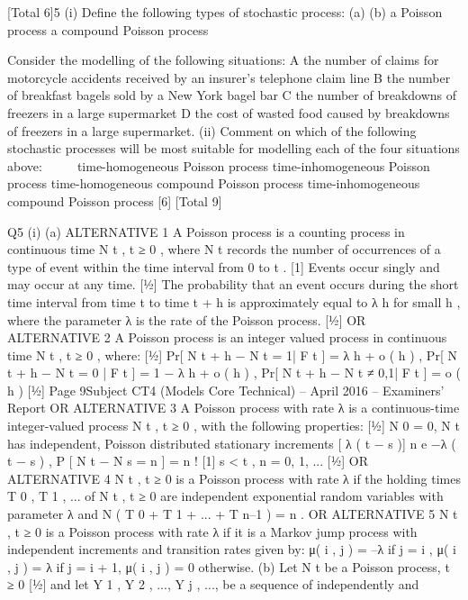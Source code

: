 \documentclass[a4paper,12pt]{article}
\begin{document}
[Total 6]5
(i)
Define the following types of stochastic process:
(a)
(b)
a Poisson process
a compound Poisson process

Consider the modelling of the following situations:
A the number of claims for motorcycle accidents received by an insurer’s
telephone claim line
B the number of breakfast bagels sold by a New York bagel bar
C the number of breakdowns of freezers in a large supermarket
D the cost of wasted food caused by breakdowns of freezers in a large
supermarket.
(ii) Comment on which of the following stochastic processes will be most suitable
for modelling each of the four situations above:




time-homogeneous Poisson process
time-inhomogeneous Poisson process
time-homogeneous compound Poisson process
time-inhomogeneous compound Poisson process
[6]
[Total 9]

Q5
(i)
(a)
ALTERNATIVE 1
A Poisson process is a counting process in continuous time { N t , t ≥ 0} ,
where N t records the number of occurrences of a type of event within
the time interval from 0 to t .
[1]
Events occur singly and may occur at any time.
[1⁄2]
The probability that an event occurs during the short time interval from
time t to time t + h is approximately equal to λ h for small h , where the
parameter λ is the rate of the Poisson process.
[1⁄2]
OR ALTERNATIVE 2
A Poisson process is an integer valued process in continuous time
{ N t , t ≥ 0} , where:
[1⁄2]
Pr[ N t + h − N t = 1| F t ] = λ h + o ( h ) ,
Pr[ N t + h − N t = 0 | F t ] = 1 − λ h + o ( h ) ,
Pr[ N t + h − N t ≠ 0,1| F t ] = o ( h )
[1⁄2]
Page 9Subject CT4 (Models Core Technical) – April 2016 – Examiners’ Report
OR ALTERNATIVE 3
A Poisson process with rate λ is a continuous-time integer-valued
process N t , t ≥ 0 , with the following properties:
[1⁄2]
N 0 = 0,
N t has independent, Poisson distributed stationary increments
[ λ ( t − s )] n e −λ ( t − s )
,
P [ N t − N s = n ] =
n !
[1]
s < t , n = 0, 1, ...
[1⁄2]
OR ALTERNATIVE 4
{ N t , t ≥ 0} is a Poisson process with rate λ if the holding times T 0 , T 1 , ...
of
{ N t , t ≥ 0} are independent exponential random variables with
parameter λ and
N ( T 0 + T 1 + ... + T n–1 ) = n .
OR ALTERNATIVE 5
{ N t , t ≥ 0} is a Poisson process with rate λ if it is a Markov jump
process with independent increments and transition rates given by:
μ( i , j ) = –λ if j = i ,
μ( i , j ) = λ if j = i + 1,
μ( i , j ) = 0 otherwise.
(b)
Let N t be a Poisson process, t ≥ 0 [1⁄2]
and let Y 1 , Y 2 , ..., Y j , ..., be a sequence of independently and
\end{document}

